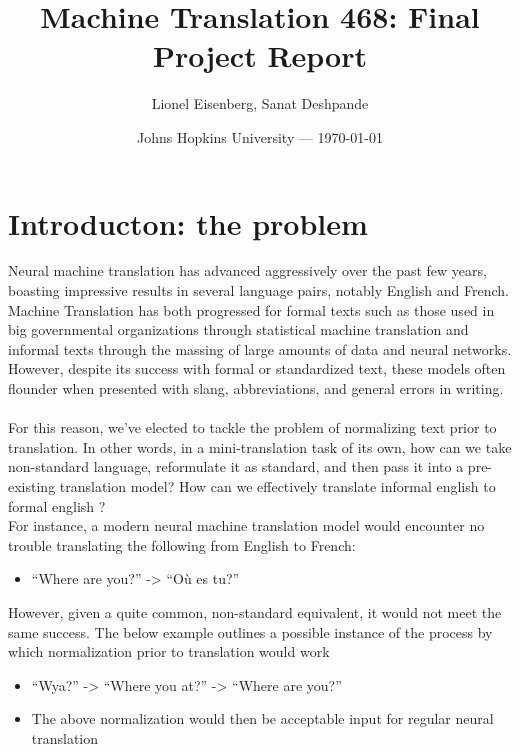 \documentclass{article}
\title{Machine Translation 468: Final Project Report} %
\author{ Lionel Eisenberg, Sanat Deshpande} %
\date{Johns Hopkins University --- \today} %
\begin{document}
\maketitle %


\section{Introducton: the problem} %
  
Neural machine translation has advanced aggressively over the past few years, boasting impressive results in several language pairs, notably English and French. Machine Translation has both progressed for formal texts such as those used in big governmental organizations through statistical machine translation and informal texts through the massing of large amounts of data and neural networks. However, despite its success with formal or standardized text, these models often flounder when presented with slang, abbreviations, and general errors in writing. \\\\
For this reason, we’ve elected to tackle the problem of normalizing text prior to translation. In other words, in a mini-translation task of its own, how can we take non-standard language, reformulate it as standard, and then pass it into a pre-existing translation model? How can we effectively translate informal english to formal english ? \\

For instance, a modern neural machine translation model would encounter no trouble translating the following from English to French:

\begin{itemize}
	\item “Where are you?” -> “Où es tu?”
\end{itemize}
However, given a quite common, non-standard equivalent, it would not meet the same success. The below example outlines a possible instance of the process by which normalization prior to translation would work
\begin{itemize}
	\item “Wya?” -> “Where you at?” -> “Where are you?”
	\item The above normalization would then be acceptable input for regular neural translation
\end{itemize}
\end{document}
